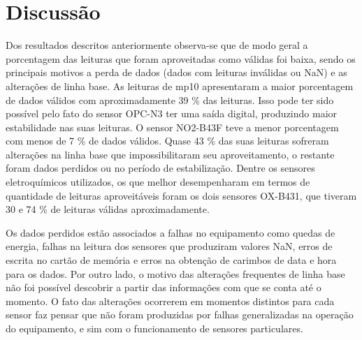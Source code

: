 





\section{Discussão}

Dos resultados descritos anteriormente observa-se que de modo geral a porcentagem das leituras que foram aproveitadas como válidas foi baixa, sendo os principais motivos a perda de dados (dados com leituras inválidas ou NaN) e as alterações de linha base. As leituras de \acrshort{mp10} apresentaram a maior porcentagem de dados válidos com aproximadamente 39 \% das leituras. Isso pode ter sido possível pelo fato do sensor OPC-N3 ter uma saída digital, produzindo maior estabilidade nas suas leituras. O sensor NO2-B43F teve a menor porcentagem com menos de 7 \% de dados válidos. Quase 43 \% das suas leituras sofreram alterações na linha base que impossibilitaram seu aproveitamento, o restante foram dados perdidos ou no período de estabilização. Dentre os sensores eletroquímicos utilizados, os que melhor desempenharam em termos de quantidade de leituras aproveitáveis foram os dois sensores OX-B431, que tiveram 30 e 74 \% de leituras válidas aproximadamente.

Os dados perdidos estão associados a falhas no equipamento como quedas de energia, falhas na leitura dos sensores que produziram valores NaN, erros de escrita no cartão de memória e erros na obtenção de carimbos de data e hora para os dados. Por outro lado, o motivo das alterações frequentes de linha base não foi possível descobrir a partir das informações com que se conta até o momento. O fato das alterações ocorrerem em momentos distintos para cada sensor faz pensar que não foram produzidas por falhas generalizadas na operação do equipamento, e sim com o funcionamento de sensores particulares.

